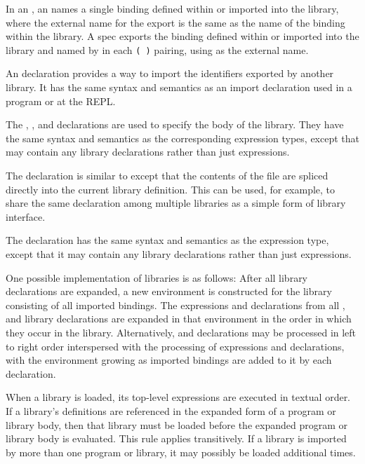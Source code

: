 In an , an  names a single
binding defined within or imported into the library, where the
external name for the export is the same as the name of the binding
within the library. A  spec exports the binding 
defined within or imported into the library and named by
 in each
{\tt( )} pairing,
using  as the external name.

An  declaration provides a way to import the identifiers
exported by another library.  It has the same syntax and semantics
as an import declaration used in a program or at the REPL.

The , , and  declarations are
used to specify the body of
the library.  They have the same syntax and semantics as the corresponding
expression types, except that
 may contain any library declarations rather than
just expressions.

The  declaration is similar to
 except that the contents of the file are spliced directly into the
current library definition.  This can be used, for example, to share the
same  declaration among multiple libraries as a simple
form of library interface.

The  declaration has the same syntax and semantics as
the  expression type, except that it may contain any
library declarations rather than just expressions.


One possible implementation of libraries is as follows:
After all  library declarations are expanded, a new
environment is constructed for the library consisting of all
imported bindings.  The expressions and
declarations from all ,  and 
library declarations are expanded in that environment in the order in which
they occur in the library.
Alternatively,  and  declarations may be processed
in left to right order interspersed with the processing of expressions
and declarations, with the environment growing as imported bindings are
added to it by each  declaration.

When a library is loaded, its top-level expressions are executed
in textual order.
If a library's definitions are referenced in the expanded form of a
program or library body, then that library must be loaded before the
expanded program or library body is evaluated. This rule applies
transitively.  If a library is imported by more than one program or
library, it may possibly be loaded additional times.

